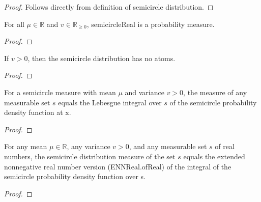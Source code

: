 \begin{proof}
  \leanok
  Follows directly from definition of semicircle distribution.
\end{proof}

\begin{lemma} %
  \label{lem:instIsProbabilityMeasuresemicircleReal}
  \leanok

  For all $\mu \in \mathbb{R}$ and $v \in \mathbb{R}_{\ge 0}$, semicircleReal is a probability measure.
\end{lemma}

\begin{proof}
\leanok
\end{proof}

\begin{lemma}
  \label{lem:noAtoms_semicircleReal}
  \leanok
  If $v > 0$, then the semicircle distribution has no atoms.
\end{lemma}

\begin{proof}
\leanok
\end{proof}

\begin{lemma}
  \label{lem:semicircleReal_apply}
  \leanok
  For a semicircle measure with mean $\mu$ and variance $v > 0$, the measure of any measurable set $s$ equals the Lebesgue integral over $s$ of the semicircle probability density function at x.
\end{lemma}

\begin{proof}
\leanok
\end{proof}

\begin{lemma}
  \label{lem:semicircleReal_apply_eq_integral}
  \leanok
  For any mean $\mu \in \mathbb{R}$, any variance $v > 0$, and any measurable set $s$ of real numbers, the semicircle distribution measure of the set $s$ equals the extended nonnegative real number version (ENNReal.ofReal) of the integral of the semicircle probability density function over s.
\end{lemma}

\begin{proof}
\leanok
\end{proof}

